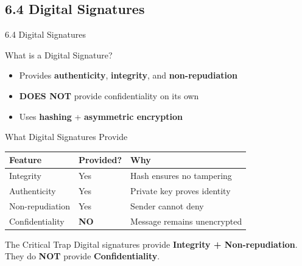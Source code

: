 \documentclass{beamer}
\begin{document}
	\subsection{6.4 Digital Signatures}
	\begin{frame}{6.4 Digital Signatures}
		\begin{block}{What is a Digital Signature?}
			\begin{itemize}
				\item Provides \textbf{authenticity}, \textbf{integrity}, and \textbf{non-repudiation}
				\item \textbf{DOES NOT} provide confidentiality on its own
				\item Uses \textbf{hashing} + \textbf{asymmetric encryption}
			\end{itemize}
		\end{block}
		
		\begin{block}{What Digital Signatures Provide}
			\begin{tabular}{|p{3cm}|p{4cm}|p{4cm}|}
				\hline
				\textbf{Feature} & \textbf{Provided?} & \textbf{Why} \\
				\hline
				Integrity & Yes & Hash ensures no tampering \\
				\hline
				Authenticity & Yes & Private key proves identity \\
				\hline
				Non-repudiation & Yes & Sender cannot deny \\
				\hline
				Confidentiality & \textbf{NO} & Message remains unencrypted \\
				\hline
			\end{tabular}
		\end{block}
		
		\begin{alertblock}{The Critical Trap}
			Digital signatures provide \textbf{Integrity + Non-repudiation}. \\
			They do \textbf{NOT} provide \textbf{Confidentiality}.
		\end{alertblock}
	\end{frame}
	
\end{document}

